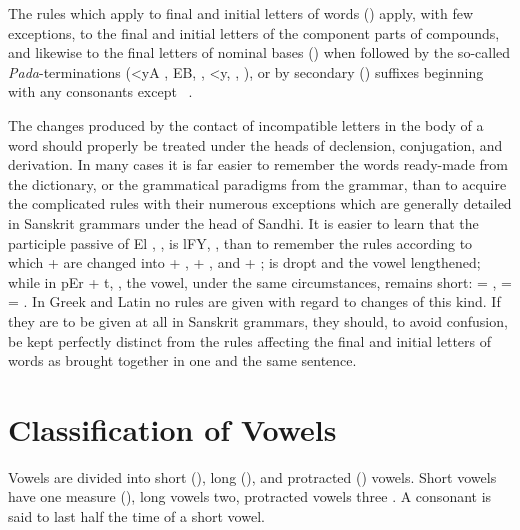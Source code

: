 The rules which apply to final and initial letters of words ()
apply, with few exceptions, to the final and initial letters of the
component parts of compounds, and likewise to the final letters of
nominal bases () when followed by the so-called
\emph{Pada}-terminations ({\dn <yA\2} , {\dn EB,} ,
{\dn <y,} , {\dn {}} ), or by secondary ()
suffixes beginning with any consonants except {\dn {}}~.

The changes produced by the contact of incompatible letters in the body
of a word should properly be treated under the heads of declension,
conjugation, and derivation. In many cases it is far easier to remember
the words ready-made from the dictionary, or the grammatical paradigms
from the grammar, than to acquire the complicated rules with their
numerous exceptions which are generally detailed in Sanskrit grammars
under the head of Sandhi. It is easier to learn that the participle
passive of {\dn El} , , is {\dn lFY,} ,
than to remember the rules according to which {\dn {}} + {\dn {}}  are
changed into {\dn {}} + {\dn {}} , {\dn {}} + {\dn {}} , and
{\dn {}} + {\dn {}} ; {\dn {}}  is dropt and the vowel
lengthened; while in {\dn pEr} + {\dn t,} , the vowel,
under the same circumstances, remains short:  =
,  =  =
. In Greek and Latin no rules are given with regard to
changes of this kind. If they are to be given at all in Sanskrit
grammars, they should, to avoid confusion, be kept perfectly distinct
from the rules affecting the final and initial letters of words as
brought together in one and the same sentence.

\section{Classification of Vowels}

\s Vowels are divided into short (), long (), and
protracted () vowels. Short vowels have one measure
(), long vowels two, protracted vowels three %
%
%
. A consonant is said to last half the time of a short vowel.

